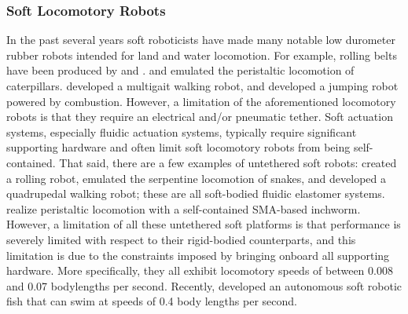 \subsubsection{Soft Locomotory Robots}
\label{subsubsec:RW Land}
In the past several years soft roboticists have made many notable low durometer rubber robots intended for land and water locomotion.
For example, rolling belts have been produced by \citet{correll2010soft} and \citet{marchese2011soft}.
\citet{trimmer2006caterpillar} and \citet{umedachi2013highly} emulated the peristaltic locomotion of caterpillars. \citet{shepherd2011multigait} developed a multigait walking robot, and \citet{shepherd2013using} developed a jumping robot powered by combustion.
However, a limitation of the aforementioned locomotory robots is that they require an electrical and/or pneumatic tether.
Soft actuation systems, especially fluidic actuation systems, typically require significant supporting hardware and often limit soft locomotory robots from being self-contained.
That said, there are a few examples of untethered soft robots:
\citet{onal2011soft} created a rolling robot, \citet{onal2013autonomous} emulated the serpentine locomotion of snakes, and \cite{tolley2014resilient} developed a quadrupedal walking robot; these are all soft-bodied fluidic elastomer systems.
\citet{seok2010peristaltic} realize peristaltic locomotion with a self-contained SMA-based inchworm.
However, a limitation of all these untethered soft platforms is that performance is severely limited with respect to their rigid-bodied counterparts, and this limitation is due to the constraints imposed by bringing onboard all supporting hardware.
More specifically, they all exhibit locomotory speeds of between 0.008 and 0.07 bodylengths per second.
Recently, \citet{marchese2014autonomous} developed an autonomous soft robotic fish that can swim at speeds of 0.4 body lengths per second.

